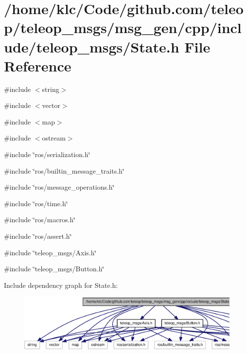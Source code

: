 \section{/home/klc/Code/github.com/teleop/teleop\_\-msgs/msg\_\-gen/cpp/include/teleop\_\-msgs/State.h File Reference}
\label{State_8h}
{\ttfamily \#include $<$string$>$}\par
{\ttfamily \#include $<$vector$>$}\par
{\ttfamily \#include $<$map$>$}\par
{\ttfamily \#include $<$ostream$>$}\par
{\ttfamily \#include \char`\"{}ros/serialization.h\char`\"{}}\par
{\ttfamily \#include \char`\"{}ros/builtin\_\-message\_\-traits.h\char`\"{}}\par
{\ttfamily \#include \char`\"{}ros/message\_\-operations.h\char`\"{}}\par
{\ttfamily \#include \char`\"{}ros/time.h\char`\"{}}\par
{\ttfamily \#include \char`\"{}ros/macros.h\char`\"{}}\par
{\ttfamily \#include \char`\"{}ros/assert.h\char`\"{}}\par
{\ttfamily \#include \char`\"{}teleop\_\-msgs/Axis.h\char`\"{}}\par
{\ttfamily \#include \char`\"{}teleop\_\-msgs/Button.h\char`\"{}}\par
Include dependency graph for State.h:
\nopagebreak
\begin{figure}[H]
\begin{center}
\leavevmode
\includegraphics[width=400pt]{State_8h__incl}
\end{center}
\end{figure}

